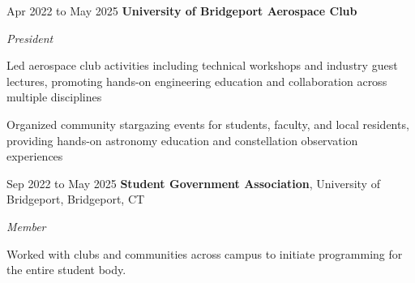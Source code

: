     \vspace{0.20 cm}
        
    \begin{twocolentry}{Apr 2022 to May 2025}
        \textbf{University of Bridgeport Aerospace Club}
    \end{twocolentry}
    \textit{President}
    \vspace{0.10 cm}
    \begin{onecolentry}
        \begin{highlights}
            \item Led aerospace club activities including technical workshops and industry guest lectures, promoting hands-on engineering education and collaboration across multiple disciplines
            \item Organized community stargazing events for students, faculty, and local residents, providing hands-on astronomy education and constellation observation experiences
        \end{highlights}
    \end{onecolentry}


    \vspace{0.20 cm}

    \begin{twocolentry}{Sep 2022 to May 2025}
        \textbf{Student Government Association}, University of Bridgeport, Bridgeport, CT
    \end{twocolentry}
    \textit{Member}
    \vspace{0.10 cm}
    \begin{onecolentry}
        \begin{highlights}
            \item Worked with clubs and communities across campus to initiate programming for the entire student body.
        \end{highlights}
    \end{onecolentry}
